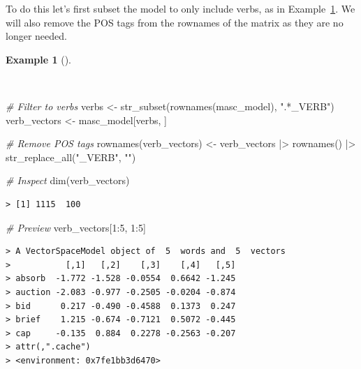 \documentclass[
  letterpaper,
]{latex/krantz}
\newenvironment{Shaded}{\begin{snugshade}}{\end{snugshade}}
\newcommand{\CommentTok}[1]{\textcolor[rgb]{0.00,0.00,0.00}{\textit{#1}}}
\newcommand{\DecValTok}[1]{\textcolor[rgb]{0.00,0.00,0.00}{#1}}
\newcommand{\FunctionTok}[1]{\textcolor[rgb]{0.00,0.00,0.00}{#1}}
\newcommand{\NormalTok}[1]{\textcolor[rgb]{0.00,0.00,0.00}{#1}}
\newcommand{\OtherTok}[1]{\textcolor[rgb]{0.00,0.00,0.00}{#1}}
\newcommand{\SpecialCharTok}[1]{\textcolor[rgb]{0.00,0.00,0.00}{#1}}
\newcommand{\StringTok}[1]{\textcolor[rgb]{0.00,0.00,0.00}{#1}}
\theoremstyle{definition}
\newtheorem{example}{Example}[chapter]
\theoremstyle{remark}
\begin{document}
To do this let's first subset the model to only include verbs, as in
Example~\ref{exm-eda-masc-vsm-word2vec-verbs}. We will also remove the
POS tags from the rownames of the matrix as they are no longer needed.

\begin{example}[]\protect\hypertarget{exm-eda-masc-vsm-word2vec-verbs}{}\label{exm-eda-masc-vsm-word2vec-verbs}

~

\begin{Shaded}
\begin{Highlighting}[]
\CommentTok{\# Filter to verbs}
\NormalTok{verbs }\OtherTok{\textless{}{-}} \FunctionTok{str\_subset}\NormalTok{(}\FunctionTok{rownames}\NormalTok{(masc\_model), }\StringTok{".*\_VERB"}\NormalTok{)}
\NormalTok{verb\_vectors }\OtherTok{\textless{}{-}}\NormalTok{ masc\_model[verbs, ]}

\CommentTok{\# Remove POS tags}
\FunctionTok{rownames}\NormalTok{(verb\_vectors) }\OtherTok{\textless{}{-}}
\NormalTok{  verb\_vectors }\SpecialCharTok{|\textgreater{}}
  \FunctionTok{rownames}\NormalTok{() }\SpecialCharTok{|\textgreater{}}
  \FunctionTok{str\_replace\_all}\NormalTok{(}\StringTok{"\_VERB"}\NormalTok{, }\StringTok{""}\NormalTok{)}

\CommentTok{\# Inspect}
\FunctionTok{dim}\NormalTok{(verb\_vectors)}
\end{Highlighting}
\end{Shaded}

\begin{verbatim}
> [1] 1115  100
\end{verbatim}

\begin{Shaded}
\begin{Highlighting}[]
\CommentTok{\# Preview}
\NormalTok{verb\_vectors[}\DecValTok{1}\SpecialCharTok{:}\DecValTok{5}\NormalTok{, }\DecValTok{1}\SpecialCharTok{:}\DecValTok{5}\NormalTok{]}
\end{Highlighting}
\end{Shaded}

\begin{verbatim}
> A VectorSpaceModel object of  5  words and  5  vectors
>           [,1]   [,2]    [,3]    [,4]   [,5]
> absorb  -1.772 -1.528 -0.0554  0.6642 -1.245
> auction -2.083 -0.977 -0.2505 -0.0204 -0.874
> bid      0.217 -0.490 -0.4588  0.1373  0.247
> brief    1.215 -0.674 -0.7121  0.5072 -0.445
> cap     -0.135  0.884  0.2278 -0.2563 -0.207
> attr(,".cache")
> <environment: 0x7fe1bb3d6470>
\end{verbatim}

\end{example}
\end{document}
